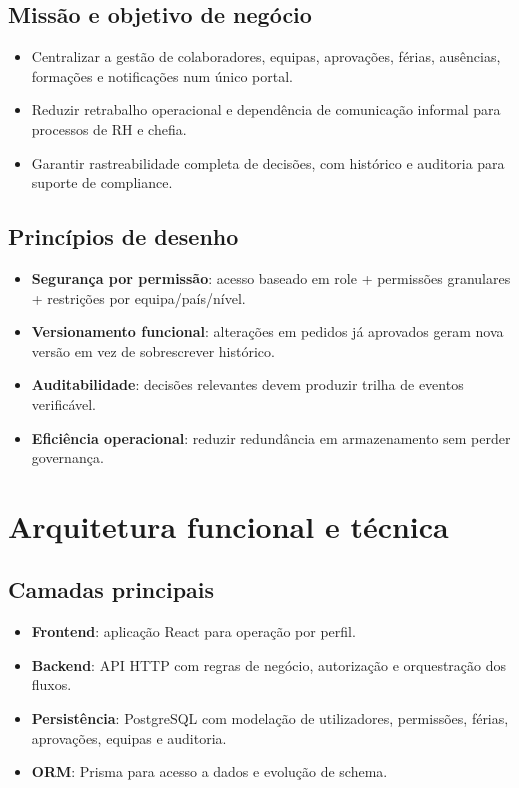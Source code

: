 \documentclass[11pt,a4paper]{article}
\begin{document}
\subsection{Missão e objetivo de negócio}
\begin{itemize}
  \item Centralizar a gestão de colaboradores, equipas, aprovações, férias, ausências, formações e notificações num único portal.
  \item Reduzir retrabalho operacional e dependência de comunicação informal para processos de RH e chefia.
  \item Garantir rastreabilidade completa de decisões, com histórico e auditoria para suporte de compliance.
\end{itemize}

\subsection{Princípios de desenho}
\begin{itemize}
  \item \textbf{Segurança por permissão}: acesso baseado em role + permissões granulares + restrições por equipa/país/nível.
  \item \textbf{Versionamento funcional}: alterações em pedidos já aprovados geram nova versão em vez de sobrescrever histórico.
  \item \textbf{Auditabilidade}: decisões relevantes devem produzir trilha de eventos verificável.
  \item \textbf{Eficiência operacional}: reduzir redundância em armazenamento sem perder governança.
\end{itemize}

\section{Arquitetura funcional e técnica}
\subsection{Camadas principais}
\begin{itemize}
  \item \textbf{Frontend}: aplicação React para operação por perfil.
  \item \textbf{Backend}: API HTTP com regras de negócio, autorização e orquestração dos fluxos.
  \item \textbf{Persistência}: PostgreSQL com modelação de utilizadores, permissões, férias, aprovações, equipas e auditoria.
  \item \textbf{ORM}: Prisma para acesso a dados e evolução de schema.
\end{itemize}
\end{document}
